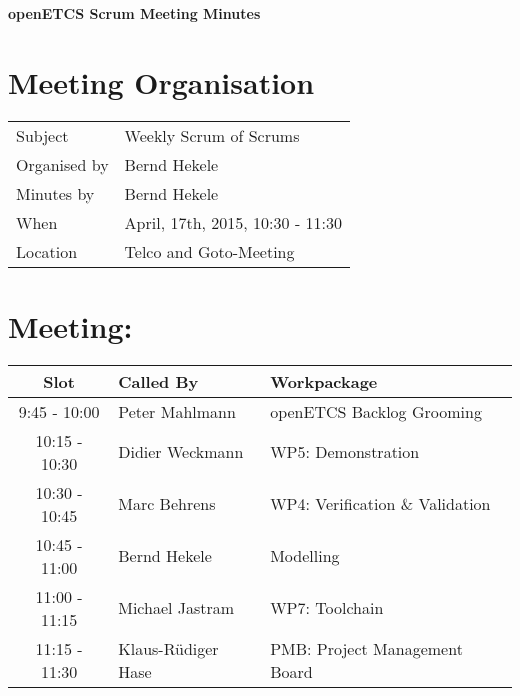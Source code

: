 \documentclass[a4paper, 11pt]{article}
\begin{document}
{\begin{center}\huge\bf openETCS Scrum Meeting Minutes\end{center}}
\section{Meeting Organisation}

\renewcommand{\arraystretch}{1.5}
\begin{supertabular}{m{.2\textwidth}m{.8\textwidth}}
Subject & Weekly Scrum of Scrums\\
Organised by &Bernd Hekele\\
Minutes by & Bernd Hekele\\
When & April, 17th, 2015, 10:30 - 11:30\\
Location & Telco and Goto-Meeting\\
\end{supertabular}

\renewcommand{\arraystretch}{1.0}
\section{Meeting:}

\begin{tabular}{|c|l|l|}
\hline
\textbf{Slot} &  \textbf{Called By} & \textbf{Workpackage} \\
\hline  
9:45 - 10:00 & Peter Mahlmann & openETCS Backlog Grooming  \\\hline
10:15 - 10:30 & Didier Weckmann & WP5: Demonstration \\\hline  
10:30 - 10:45 & Marc Behrens & WP4: Verification \& Validation \\\hline  
10:45 - 11:00 & Bernd Hekele & Modelling \\\hline  
11:00 - 11:15 & Michael Jastram  & WP7: Toolchain \\\hline
11:15 - 11:30 & Klaus-R\"udiger Hase & PMB: Project Management Board \\\hline  
\end{tabular}
\end{document}
